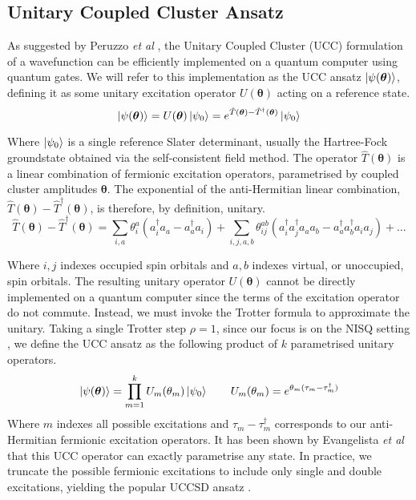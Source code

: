 \subsection{Unitary Coupled Cluster Ansatz}%
\label{unitary-coupled-cluster-ansatz}

As suggested by Peruzzo \textit{et al} \cite{Peruzzo2014}, the Unitary Coupled Cluster (UCC) formulation of a wavefunction can be efficiently implemented on a quantum computer using quantum gates. We will refer to this implementation as the UCC ansatz $\ket{\psi(\bm\theta)}$, defining it as some unitary excitation operator $U(\bm\theta)$ acting on a reference state.
\begin{equation*}
    \ket{\psi(\bm\theta)} = U(\bm\theta) \ket{\psi_0} =
    e^{\hat T(\bm\theta) - \hat T^\dagger(\bm\theta)} \ket{\psi_0}
\end{equation*}

Where $\ket{\psi_0}$ is a single reference Slater determinant, usually the Hartree-Fock groundstate obtained via the self-consistent field method. The operator $\hat T(\bm\theta)$ is a linear combination of fermionic excitation operators, parametrised by coupled cluster amplitudes $\bm\theta$. The exponential of the anti-Hermitian linear combination, $\hat T(\bm\theta) - \hat T^\dagger(\bm\theta)$, is therefore, by definition, unitary. 
\begin{equation*}
\hat T(\bm{\theta}) - \hat T^{\dagger}(\bm{\theta}) =
\sum_{i, a} \theta^a_i (a^\dagger_i a_a - a^\dagger_a a_i) + 
\sum_{i, j, a, b} \theta^{ab}_{ij} (a^\dagger_i a^\dagger_j a_a a_b - a^\dagger_a a^\dagger_b a_i a_j) + \dots
\end{equation*}

Where $i, j$ indexes occupied spin orbitals and $a, b$ indexes virtual, or unoccupied, spin orbitals. The resulting unitary operator $U(\bm\theta)$ cannot be directly implemented on a quantum computer since the terms of the excitation operator do not commute. Instead, we must invoke the Trotter formula to approximate the unitary. Taking a single Trotter step $\rho=1$, since our focus is on the NISQ setting \cite{Cowtan2020}, we define the UCC ansatz as the following product of $k$ parametrised unitary operators.
\begin{equation*}
    \ket{\psi(\bm\theta)} = \prod_{m=1}^k U_m(\theta_m) \ket{\psi_0} \qquad
    U_m(\theta_m) = e^{\theta_m (\tau_m - \tau_m^\dagger)}
\end{equation*}
Where $m$ indexes all possible excitations and $\tau_m - \tau_m^\dagger$ corresponds to our anti-Hermitian fermionic excitation operators. It has been shown by Evangelista \textit{et al} \cite{Evangelista2019} that this UCC operator can exactly parametrise any state. In practice, we truncate the possible fermionic excitations to include only single and double excitations, yielding the popular UCCSD ansatz \cite{Chan2021}.

